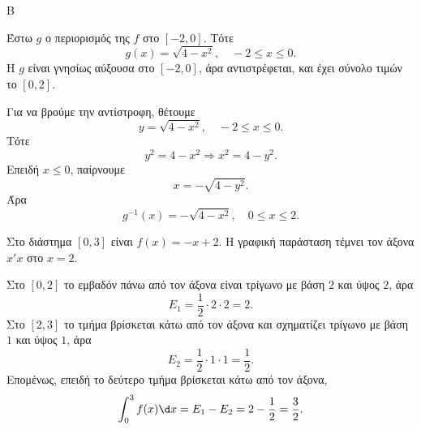 \begin{thema}{Β}
\begin{erwthma}
Έστω $g$ ο περιορισμός της $f$ στο $[-2,0]$. Τότε
\[
g(x)=\sqrt{4-x^2},\quad -2\leq x\leq 0.
\]
Η $g$ είναι γνησίως αύξουσα στο $[-2,0]$, άρα αντιστρέφεται, και έχει σύνολο τιμών το $[0,2]$.

Για να βρούμε την αντίστροφη, θέτουμε
\[
y=\sqrt{4-x^2},\quad -2\leq x\leq 0.
\]
Τότε
\[
y^2=4-x^2\Rightarrow x^2=4-y^2.
\]
Επειδή $x\leq 0$, παίρνουμε
\[
x=-\sqrt{4-y^2}.
\]
Άρα
\[
g^{-1}(x)=-\sqrt{4-x^2},\quad 0\leq x\leq 2.
\]

\item Στο διάστημα $[0,3]$ είναι $f(x)=-x+2$. Η γραφική παράσταση τέμνει τον άξονα $x'x$ στο $x=2$.

Στο $[0,2]$ το εμβαδόν πάνω από τον άξονα είναι τρίγωνο με βάση $2$ και ύψος $2$, άρα
\[
E_1=\frac{1}{2}\cdot 2\cdot 2=2.
\]
Στο $[2,3]$ το τμήμα βρίσκεται κάτω από τον άξονα και σχηματίζει τρίγωνο με βάση $1$ και ύψος $1$, άρα
\[
E_2=\frac{1}{2}\cdot 1\cdot 1=\frac{1}{2}.
\]
Επομένως, επειδή το δεύτερο τμήμα βρίσκεται κάτω από τον άξονα,
\[
\dint_{0}^{3}f(x)\d x=E_1-E_2=2-\frac{1}{2}=\frac{3}{2}.
\]
\end{erwthma}
\end{thema}



